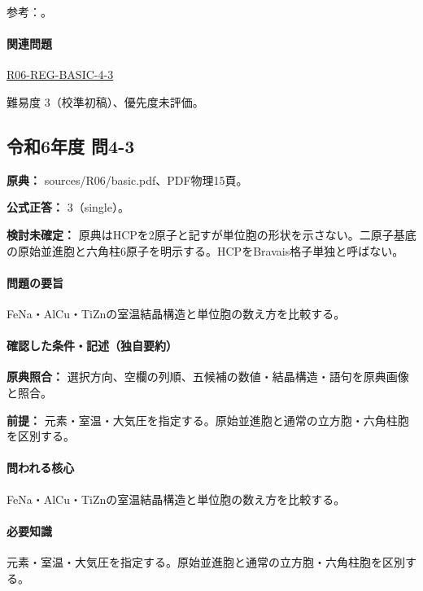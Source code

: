 \par 参考：\cite{cambridge_unitcell,princeton_hcp,princeton_iron,princeton_aluminum,princeton_copper,princeton_sodium,princeton_titanium,princeton_zinc}。

\paragraph{関連問題} \hyperref[q:r06-reg-basic-4-3]{R06-REG-BASIC-4-3}

\par 難易度 3（校準初稿）、優先度未評価。

\subsection{令和6年度 問4-3}
\label{q:r06-reg-basic-4-3}

\noindent\textbf{原典：} sources/R06/basic.pdf、PDF物理15頁。

\textbf{公式正答：} 3（single）。

\par\textbf{検討未確定：} 原典はHCPを2原子と記すが単位胞の形状を示さない。二原子基底の原始並進胞と六角柱6原子を明示する。HCPをBravais格子単独と呼ばない。

\paragraph{問題の要旨} FeNa・AlCu・TiZnの室温結晶構造と単位胞の数え方を比較する。

\paragraph{確認した条件・記述（独自要約）}\mbox{}\par

\noindent\textbf{原典照合：} 選択方向、空欄の列順、五候補の数値・結晶構造・語句を原典画像と照合。\par

\noindent\textbf{前提：} 元素・室温・大気圧を指定する。原始並進胞と通常の立方胞・六角柱胞を区別する。\par

\paragraph{問われる核心} FeNa・AlCu・TiZnの室温結晶構造と単位胞の数え方を比較する。

\paragraph{必要知識} 元素・室温・大気圧を指定する。原始並進胞と通常の立方胞・六角柱胞を区別する。

